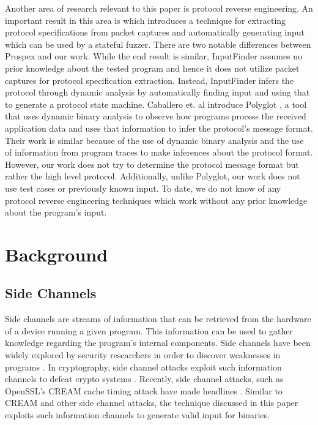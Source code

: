 \documentclass{acm_proc_article-sp}
\def \tool {InputFinder}
\begin{document}
Another area of research relevant to this paper is protocol reverse engineering.
An important result in this area is \cite{prospex} which introduces a technique for extracting protocol specifications from packet captures and automatically generating input which can be used by a stateful fuzzer.
There are two notable differences between Prospex and our work.
While the end result is similar, \tool{} assumes no prior knowledge about the tested program and hence it does not utilize packet captures for protocol specification extraction.
Instead, \tool{} infers the protocol through dynamic analysis by automatically finding input and using that to generate a protocol state machine.
Caballero et. al introduce Polyglot \cite{polyglot}, a tool that uses dynamic binary analysis to observe how programs process the received application data and uses that information to infer the protocol's message format.
Their work is similar because of the use of dynamic binary analysis and the use of information from program traces to make inferences about the protocol format.
However, our work does not try to determine the protocol message format but rather the high level protocol.
Additionally, unlike Polyglot, our work does not use test cases or previously known input.
To date, we do not know of any protocol reverse engineering techniques which work without any prior knowledge about the program's input.

\section{Background} \label{background}

\subsection{Side Channels} \label{bg_sidechannels}
Side channels are streams of information that can be retrieved from the hardware of a device running a given program.
This information can be used to gather knowledge regarding the program's internal components.
Side channels have been widely explored by security researchers in order to discover weaknesses in programs \cite{weinbergside, schindler2002combined, genkin2014rsa, genkinstealing}.
In cryptography, side channel attacks exploit such information channels to defeat crypto systems \cite{zhou2005side, black2002black, okeya2006side}.
Recently, side channel attacks, such as OpenSSL's CREAM cache timing attack have made headlines \cite{creamssl}.
Similar to CREAM and other side channel attacks, the technique discussed in this paper exploits such information channels to generate valid input for binaries.
\end{document}
